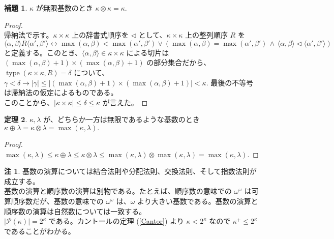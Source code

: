 \documentclass{jsarticle}
\theoremstyle{definition}
\newtheorem{theorem}{定理}[section]
\newtheorem{lemma}[theorem]{補題}
\newtheorem{remark}{注}[section]
\begin{document}
    \begin{lemma}
        $\kappa$ が無限基数のとき $\kappa \otimes \kappa = \kappa.$
    \end{lemma}
    \begin{proof} \ \\
        帰納法で示す。$\kappa \times \kappa$ 上の辞書式順序を $\lhd$ として、$\kappa \times \kappa$ 上の整列順序 $R$ を\\
        $\langle \alpha, \beta \rangle R \langle \alpha', \beta' \rangle \leftrightarrow \max(\alpha, \beta) < \max(\alpha', \beta') \lor (\max(\alpha, \beta) = \max(\alpha', \beta') \, \land \, \langle \alpha, \beta \rangle \lhd \langle \alpha', \beta' \rangle )$\\
        と定義する。このとき、$\langle \alpha, \beta \rangle \in \kappa \times \kappa$ による切片は $(\max(\alpha, \beta)+1) \times (\max(\alpha, \beta)+1)$ の部分集合だから、\\
        $\operatorname{type}(\kappa \times \kappa, R) = \delta$ について、$\gamma < \delta \rightarrow |\gamma| \leq |(\max(\alpha, \beta) + 1) \times (\max(\alpha, \beta) + 1)| < \kappa.$ 最後の不等号は帰納法の仮定によるものである。\\
        このことから、$|\kappa \times \kappa| \leq \delta \leq \kappa$ が言えた。
    \end{proof}
    
    \begin{theorem} \label{cardinal_operations}
        $\kappa, \lambda$ が、どちらか一方は無限であるような基数のとき $\kappa \oplus \lambda = \kappa \otimes \lambda = \max(\kappa, \lambda).$
    \end{theorem}
    \begin{proof}
        $\max(\kappa, \lambda) \leq \kappa \oplus \lambda \leq \kappa \otimes \lambda \leq \max(\kappa, \lambda) \otimes \max(\kappa, \lambda) = \max(\kappa, \lambda).$
    \end{proof}
    
    \begin{remark}
        基数の演算については結合法則や分配法則、交換法則、そして指数法則が成立する。\\
        基数の演算と順序数の演算は別物である。たとえば、順序数の意味での $\omega^\omega$ は可算順序数だが、基数の意味での $\omega^\omega$ は、$\omega$ より大きい基数である。基数の演算と順序数の演算は自然数については一致する。\\
        $|\mathcal{P}(\kappa)| = 2^\kappa$ である。カントールの定理 (\ref{Cantor}) より $\kappa < 2^\kappa$ なので $\kappa^+ \leq 2^\kappa$ であることがわかる。
    \end{remark}
    
\end{document}
